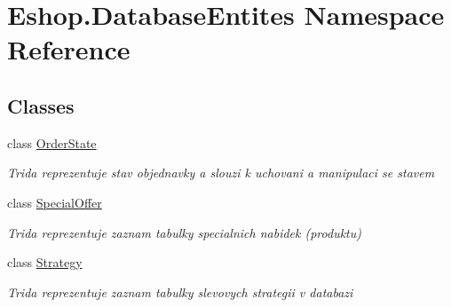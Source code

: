 \hypertarget{namespace_eshop_1_1_database_entites}{}\section{Eshop.\+Database\+Entites Namespace Reference}
\label{namespace_eshop_1_1_database_entites}
\subsection*{Classes}
\begin{DoxyCompactItemize}
\item 
class \mbox{\hyperlink{class_eshop_1_1_database_entites_1_1_order_state}{Order\+State}}
\begin{DoxyCompactList}\small\item\em Trida reprezentuje stav objednavky a slouzi k uchovani a manipulaci se stavem \end{DoxyCompactList}\item 
class \mbox{\hyperlink{class_eshop_1_1_database_entites_1_1_special_offer}{Special\+Offer}}
\begin{DoxyCompactList}\small\item\em Trida reprezentuje zaznam tabulky specialnich nabidek (produktu) \end{DoxyCompactList}\item 
class \mbox{\hyperlink{class_eshop_1_1_database_entites_1_1_strategy}{Strategy}}
\begin{DoxyCompactList}\small\item\em Trida reprezentuje zaznam tabulky slevovych strategii v databazi \end{DoxyCompactList}\end{DoxyCompactItemize}
